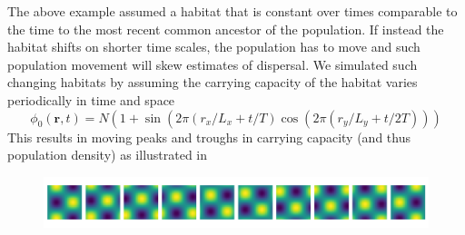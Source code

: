 \documentclass[aps,rmp, onecolumn]{revtex4}
\newcommand{\rvec}{\mathbf{r}}
\begin{document}
The above example assumed a habitat that is constant over times comparable to the time to the most recent common ancestor of the population.
If instead the habitat shifts on shorter time scales, the population has to move and such population movement will skew estimates of dispersal.
We simulated such changing habitats by assuming the carrying capacity of the habitat varies periodically in time and space
\begin{equation}
    \phi_0(\rvec, t) = N\left(1 + \sin(2\pi (r_x/L_x + t/T)\cos(2\pi (r_y/L_y + t/2T)))
\end{equation}
This results in moving peaks and troughs in carrying capacity (and thus population density) as illustrated in

\begin{figure}
    \includegraphics[width=\textwidth]{figures/habitats.png}
    \caption{\label{fig:moving_habitats}}
\end{figure}



\end{document}
